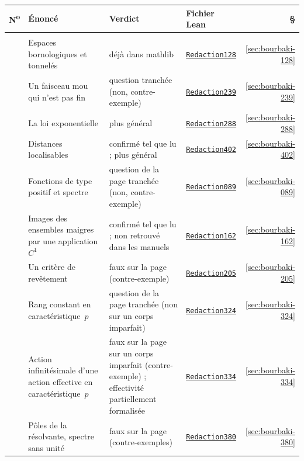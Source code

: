 \documentclass[11pt]{article}
\newcommand{\leanblobmain}{https://github.com/Commutator-IO/grothendieck-project/blob/main/lean/Bourbaki}
\theoremstyle{plain}
\theoremstyle{definition}
\theoremstyle{plain}
\theoremstyle{definition}
\theoremstyle{remark}
\renewcommand{\_}{\bkunderscore\allowbreak}
\begin{document}
\begin{center}
{\small\setlength{\tabcolsep}{4pt}
\begin{longtable}{@{}>{\raggedright\arraybackslash}p{1.2cm}>{\raggedright\arraybackslash}p{6.3cm}>{\raggedright\arraybackslash}p{3.6cm}>{\raggedright\arraybackslash}p{2.6cm}r@{}}
\toprule
N\textsuperscript{o} & Énoncé & Verdict & Fichier Lean & \S\\
\midrule
\endhead
\multicolumn{5}{@{}l}{\textit{Analyse et topologie}}\\[1pt]
128 & Espaces bornologiques et tonnelés & déjà dans mathlib & \href{\leanblobmain/Redaction128.lean}{\texttt{Redaction128}} & \ref{sec:bourbaki-128}\\
239 & Un faisceau mou qui n'est pas fin & question tranchée (non, contre-exemple) & \href{\leanblobmain/Redaction239.lean}{\texttt{Redaction239}} & \ref{sec:bourbaki-239}\\
288 & La loi exponentielle & plus général & \href{\leanblobmain/Redaction288.lean}{\texttt{Redaction288}} & \ref{sec:bourbaki-288}\\
402 & Distances localisables & confirmé tel que lu ; plus général & \href{\leanblobmain/Redaction402.lean}{\texttt{Redaction402}} & \ref{sec:bourbaki-402}\\
089 & Fonctions de type positif et spectre & question de la page tranchée (non, contre-exemple) & \href{\leanblobmain/Redaction089.lean}{\texttt{Redaction089}} & \ref{sec:bourbaki-089}\\
162 & Images des ensembles maigres par une application $C^1$ & confirmé tel que lu ; non retrouvé dans les manuels & \href{\leanblobmain/Redaction162.lean}{\texttt{Redaction162}} & \ref{sec:bourbaki-162}\\
205 & Un critère de revêtement & faux sur la page (contre-exemple) & \href{\leanblobmain/Redaction205.lean}{\texttt{Redaction205}} & \ref{sec:bourbaki-205}\\
324 & Rang constant en caractéristique~$p$ & question de la page tranchée (non sur un corps imparfait) & \href{\leanblobmain/Redaction324.lean}{\texttt{Redaction324}} & \ref{sec:bourbaki-324}\\
334 & Action infinitésimale d'une action effective en caractéristique~$p$ & faux sur la page sur un corps imparfait (contre-exemple) ; effectivité partiellement formalisée & \href{\leanblobmain/Redaction334.lean}{\texttt{Redaction334}} & \ref{sec:bourbaki-334}\\
380 & Pôles de la résolvante, spectre sans unité & faux sur la page (contre-exemples) & \href{\leanblobmain/Redaction380.lean}{\texttt{Redaction380}} & \ref{sec:bourbaki-380}\\

\end{longtable}}
\end{center}
\end{document}
